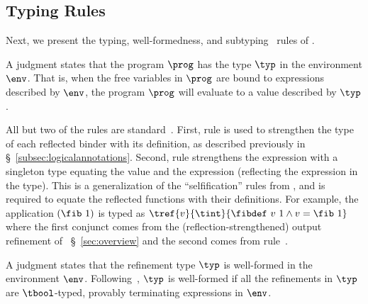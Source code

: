 \subsection{Typing Rules}

%
Next, we present the
typing, well-formedness, and subtyping~\citep{Knowles10,Vazou14}
rules of \corelan.

A judgment \hastype{\env}{\prog}{\typ} states that
the program $\prog$ has the type $\typ$ in
the environment $\env$.
That is, when the free variables in $\prog$ are
bound to expressions described by $\env$, the
program $\prog$ will evaluate to a value
described by $\typ$.

%
All but two of the rules are standard~\cite{Knowles10,Vazou14}.
%
First, rule \rtreflect is used to strengthen the type of each
reflected binder with its definition, as described previously
in \S~\ref{subsec:logicalannotations}.
%
Second, rule \rtexact strengthens the expression with
a singleton type equating the value and the expression
(\ie reflecting the expression in the type).
%
This is a generalization of the ``selfification'' rules
from \cite{Ou2004,Knowles10}, and is required to
equate the reflected functions with their definitions.
%
For example, the application $(\fib\ 1)$ is typed as
${\tref{v}{\tint}{\fibdef\ v\ 1 \wedge v = \fib\ 1}}$ where
the first conjunct comes from the (reflection-strengthened)
output refinement of \fib~\S~\ref{sec:overview} and
the second comes from rule~\rtexact.
%


A judgment \iswellformed{\env}{\typ} states that
the refinement type $\typ$ is well-formed in
the environment $\env$.
%
Following~\citep{Vazou14}, $\typ$ is well-formed if all
the refinements in $\typ$ are $\tbool$-typed,
provably terminating expressions in $\env$.
%


